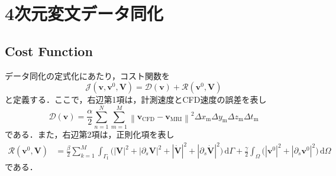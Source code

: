 \documentclass[a4paper,xelatex,ja=standard]{bxjsarticle}
\begin{document}
\section{4次元変文データ同化}
\subsection{Cost Function}
データ同化の定式化にあたり，コスト関数を
\begin{equation}
    \label{eq:cost_function}
    \mathcal{J}(\mathbf{v}, \mathbf{v}^{0}, \mathbf{V}) = \mathcal{D}(\mathbf{v}) + \mathcal{R}(\mathbf{v}^{0}, \mathbf{V})
\end{equation}
と定義する．ここで，右辺第1項は，計測速度とCFD速度の誤差を表し
\begin{equation}
    \label{eq:error_function}
    \mathcal{D}(\mathbf{v}) = 
    \frac{\alpha}{2} \sum_{n=1}^{N} \sum_{m=1}^{M} \left\|\mathbf{v}_\text{CFD}-\mathbf{v}_{\text{MRI}}\right\|^2 \Delta x_{\mathrm{m}} \Delta y_{\mathrm{m}} \Delta z_{\mathrm{m}} \Delta t_{\mathrm{m}} 
\end{equation}
である．また，右辺第2項は，正則化項を表し
\begin{equation}
    \label{eq:regularization}
    \begin{aligned}
    \mathcal{R}(\mathbf{v}^0, \mathbf{V}) 
    &= \frac{\beta}{2} \sum_{k=1}^{M} \int_{\Gamma_\mathrm{I}} \big( \left|\mathbf{V}\right|^2+\left|\partial_s \mathbf{V}\right|^2+\left|\dot{\mathbf{V}}\right|^2+\left|\partial_s \dot{\mathbf{V}}\right|^2 \big) \, \mathrm{d}\Gamma
    + \frac{\gamma}{2} \int_{\Omega}  \big( \left|\mathbf{v}^{0}\right|^2+\left|\partial_s \mathbf{v}^{0} \right|^2  \big) \, \mathrm{d}\Omega
    \end{aligned}
\end{equation}
である．
\end{document}
